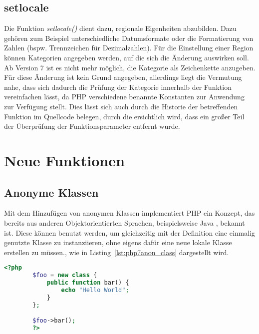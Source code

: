     \subsection{setlocale}
    Die Funktion \textit{setlocale()} dient dazu, regionale Eigenheiten abzubilden. Dazu gehören zum Beispiel unterschiedliche Datumsformate oder die Formatierung von 
    Zahlen (bspw. Trennzeichen für Dezimalzahlen). Für die Einstellung einer Region können Kategorien angegeben werden, auf die sich die Änderung auswirken soll. 
    Ab Version 7 ist es nicht mehr möglich, die Kategorie als Zeichenkette anzugeben. Für diese Änderung ist kein Grund angegeben, allerdings liegt die Vermutung
    nahe, dass sich dadurch die Prüfung der Kategorie innerhalb der Funktion vereinfachen lässt, da \acs{PHP} verschiedene benannte Konstanten zur Anwendung zur Verfügung 
    stellt. Dies lässt sich auch durch die Historie der betreffenden Funktion im Quellcode belegen, durch die ersichtlich wird, dass ein großer Teil der Überprüfung
    der Funktionsparameter entfernt wurde. \cite{nikic_remove_2014}

\section{Neue Funktionen}
    \subsection{Anonyme Klassen}
    Mit dem Hinzufügen von anonymen Klassen implementiert \acs{PHP} ein Konzept, das bereits aus anderen Objektorientierten Sprachen, beispielsweise Java 
    \cite{oracle_anonymous_nodate}, bekannt ist. Diese können benutzt werden, um gleichzeitig mit der Definition eine einmalig genutzte Klasse zu instanziieren, ohne eigens 
    dafür eine neue lokale Klasse erstellen zu müssen., wie in Listing~\ref{lst:php7anon_class} dargestellt wird.

    \begin{lstlisting}[language=php, caption={Beispiel der Nutzung anonymer Klassen}, label={lst:php7anon_class}]
        <?php
        $foo = new class {
            public function bar() {
                echo "Hello World";
            }
        };

        $foo->bar();
        ?>
    \end{lstlisting}

